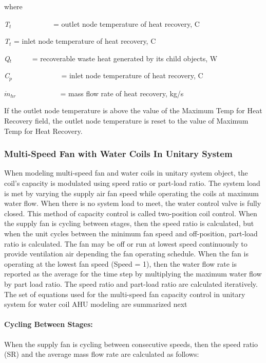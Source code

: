 where

\emph{T\(_{t}\)}~~~~~~~~~~~ = outlet node temperature of heat recovery, C

\emph{T\(_{t}\)} = inlet node temperature of heat recovery, C

\emph{Q\(_{t}\)}~~~~~ = recoverable waste heat generated by its child objects, W

\emph{C\(_{p}\)}~~~~~~~~~~~~~ = inlet node temperature of heat recovery, C

\({\dot m_{hr}}\) ~~~~~~~~~~~ = mass flow rate of heat recovery, kg/s

If the outlet node temperature is above the value of the Maximum Temp for Heat Recovery field, the outlet node temperature is reset to the value of Maximum Temp for Heat Recovery.

\subsubsection{Multi-Speed Fan with Water Coils In Unitary System}\label{multi-speed-fan-with-water-coils-in-unitary-system}

When modeling multi-speed fan and water coils in unitary system object, the coil's capacity is modulated using speed ratio or part-load ratio. The system load is met by varying the supply air fan speed while operating the coils at maximum water flow. When there is no system load to meet, the water control valve is fully closed. This method of capacity control is called two-position coil control. When the supply fan is cycling between stages, then the speed ratio is calculated, but when the unit cycles between the minimum fan speed and off-position, part-load ratio is calculated. The fan may be off or run at lowest speed continuously to provide ventilation air depending the fan operating schedule. When the fan is operating at the lowest fan speed (Speed = 1), then the water flow rate is reported as the average for the time step by multiplying the maximum water flow by part load ratio. The speed ratio and part-load ratio are calculated iteratively. The set of equations used for the multi-speed fan capacity control in unitary system for water coil AHU modeling are summarized next

\paragraph{Cycling Between Stages:}\label{cycling-between-stages}

When the supply fan is cycling between consecutive speeds, then the speed ratio (SR) and the average mass flow rate are calculated as follows:


